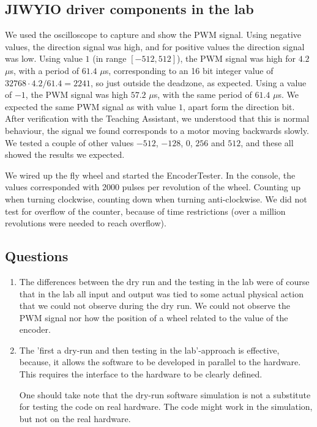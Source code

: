 \documentclass[a4paper,twoside,11pt]{article}
\begin{document}
\subsection{JIWYIO driver components in the lab}
We used the oscilloscope to capture and show the PWM signal. Using negative values, the direction signal was high, and for positive values the direction signal was low. Using value $1$ (in range $[-512, 512]$), the PWM signal was high for $4.2$ $\mu$s, with a period of $61.4$ $\mu$s, corresponding to an 16 bit integer value of $32768 \cdot 4.2/61.4 = 2241$, so just outside the deadzone, as expected. Using a value of  $-1$, the PWM signal was high $57.2$ $\mu$s, with the same period of $61.4$ $\mu$s. We expected the same PWM signal as with value $1$, apart form the direction bit. After verification with the Teaching Assistant, we understood that this is normal behaviour, the signal we found corresponds to a motor moving backwards slowly. We tested a couple of other values $-512$, $-128$, $0$, $256$ and $512$, and these all showed the results we expected.

We wired up the fly wheel and started the EncoderTester. In the console, the values corresponded with 2000 pulses per revolution of the wheel. Counting up when turning clockwise, counting down when turning anti-clockwise. We did not test for overflow of the counter, because of time restrictions (over a million revolutions were needed to reach overflow).

\subsection{Questions}
\begin{enumerate}
 \item The differences between the dry run and the testing in the lab were of course that in the lab all input and output was tied to some actual physical action that we could not observe during the dry run. We could not observe the PWM signal nor how the position of a wheel related to the value of the encoder.
 \item The 'first a dry-run and then testing in the lab'-approach is effective, because, it allows the software to be developed in parallel to the hardware.
	 This requires the interface to the hardware to be clearly defined.

	 One should take note that the dry-run software simulation is not a 
	 substitute for testing the code on real hardware.
	 The code might work in the simulation, but not on the real hardware.
\end{enumerate}
\end{document}
